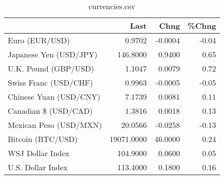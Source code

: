 \documentclass{article}%
\begin{document}
%


\begin{table}[htbp]%
\caption{currencies.csv}%
\centering%
\begin{adjustbox}{width=1\textwidth}%
\begin{tabular}{lrrr}
\toprule
                       &       Last &    Chng &  \%Chng \\
\midrule
        Euro (EUR/USD) &     0.9702 & -0.0004 &  -0.04 \\
Japanese Yen (USD/JPY) &   146.8000 &  0.9400 &   0.65 \\
  U.K. Pound (GBP/USD) &     1.1047 &  0.0079 &   0.72 \\
 Swiss Franc (USD/CHF) &     0.9963 & -0.0005 &  -0.05 \\
Chinese Yuan (USD/CNY) &     7.1739 &  0.0081 &   0.11 \\
  Canadian \$ (USD/CAD) &     1.3816 &  0.0018 &   0.13 \\
Mexican Peso (USD/MXN) &    20.0566 & -0.0258 &  -0.13 \\
     Bitcoin (BTC/USD) & 19071.0000 & 46.0000 &   0.24 \\
      WSJ Dollar Index &   104.9000 &  0.0600 &   0.05 \\
     U.S. Dollar Index &   113.4000 &  0.1800 &   0.16 \\
\bottomrule
\end{tabular}
%
\end{adjustbox}%
\end{table}

%
\end{document}
